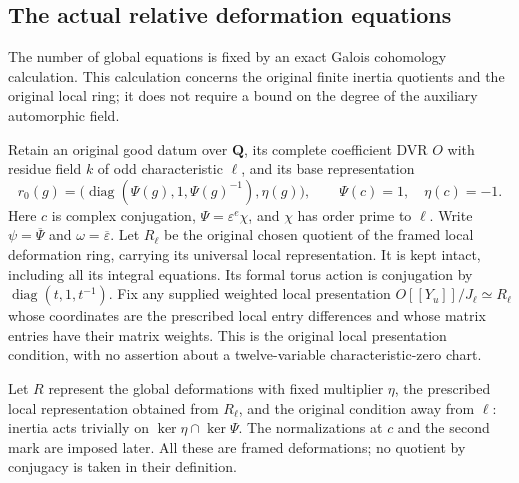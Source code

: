 \subsection{The actual relative deformation equations}
\label{sec:support-relative-presentation}

The number of global equations is fixed by an exact Galois cohomology
calculation.  This calculation concerns the original finite inertia
quotients and the original local ring; it does not require a bound on
the degree of the auxiliary automorphic field.

Retain an original good datum over $\mathbf Q$, its complete
coefficient DVR $O$ with residue field $k$ of odd characteristic
$\ell$, and its base representation
\[
 r_0(g)=\bigl(\operatorname{diag}(\Psi(g),1,\Psi(g)^{-1}),
                  \eta(g)\bigr),
 \qquad \Psi(c)=1,\quad\eta(c)=-1.
                                                               \tag{RP1}
\]
Here $c$ is complex conjugation, $\Psi=\varepsilon^e\chi$, and
$\chi$ has order prime to $\ell$.  Write $\psi=\overline\Psi$
and $\omega=\overline\varepsilon$.  Let $R_\ell$ be the original
chosen quotient of the framed local deformation ring, carrying its
universal local representation.  It is kept intact, including all
its integral equations.  Its formal torus action is conjugation by
$\operatorname{diag}(t,1,t^{-1})$.
Fix any supplied weighted local presentation
$O[[Y_u]]/J_\ell\simeq R_\ell$ whose coordinates are the prescribed
local entry differences and whose matrix entries have their matrix
weights.  This is the original local presentation condition, with
no assertion about a twelve-variable characteristic-zero chart.

Let $R$ represent the global deformations with fixed multiplier $\eta$,
the prescribed local representation obtained from $R_\ell$, and the
original condition away from $\ell$: inertia acts trivially on
$\ker\eta\cap\ker\Psi$.  The normalizations at $c$ and the second
mark are imposed later.  All these are framed deformations; no
quotient by conjugacy is taken in their definition.

